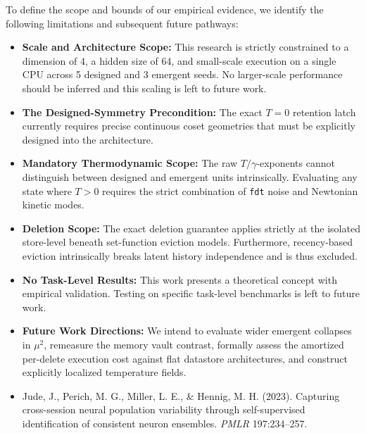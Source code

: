 \documentclass{article}
\begin{document}
To define the scope and bounds of our empirical evidence, we identify the following limitations and subsequent future pathways:
\begin{itemize}
    \item \textbf{Scale and Architecture Scope:} This research is strictly constrained to a dimension of 4, a hidden size of 64, and small-scale execution on a single CPU across 5 designed and 3 emergent seeds. No larger-scale performance should be inferred and this scaling is left to future work.
    \item \textbf{The Designed-Symmetry Precondition:} The exact $T=0$ retention latch currently requires precise continuous coset geometries that must be explicitly designed into the architecture.
    \item \textbf{Mandatory Thermodynamic Scope:} The raw $T/\gamma$-exponents cannot distinguish between designed and emergent units intrinsically. Evaluating any state where $T>0$ requires the strict combination of \texttt{fdt} noise and Newtonian kinetic modes.
    \item \textbf{Deletion Scope:} The exact deletion guarantee applies strictly at the isolated store-level beneath set-function eviction models. Furthermore, recency-based eviction intrinsically breaks latent history independence and is thus excluded.
    \item \textbf{No Task-Level Results:} This work presents a theoretical concept with empirical validation. Testing on specific task-level benchmarks is left to future work.
    \item \textbf{Future Work Directions:} We intend to evaluate wider emergent collapses in $\mu^2$, remeasure the memory vault contrast, formally assess the amortized per-delete execution cost against flat datastore architectures, and construct explicitly localized temperature fields.
\end{itemize}



\begin{itemize}
\item Jude, J., Perich, M. G., Miller, L. E., \& Hennig, M. H. (2023). Capturing cross-session neural population variability through self-supervised identification of consistent neuron ensembles. \emph{PMLR} 197:234--257.
\end{itemize}
\end{document}
